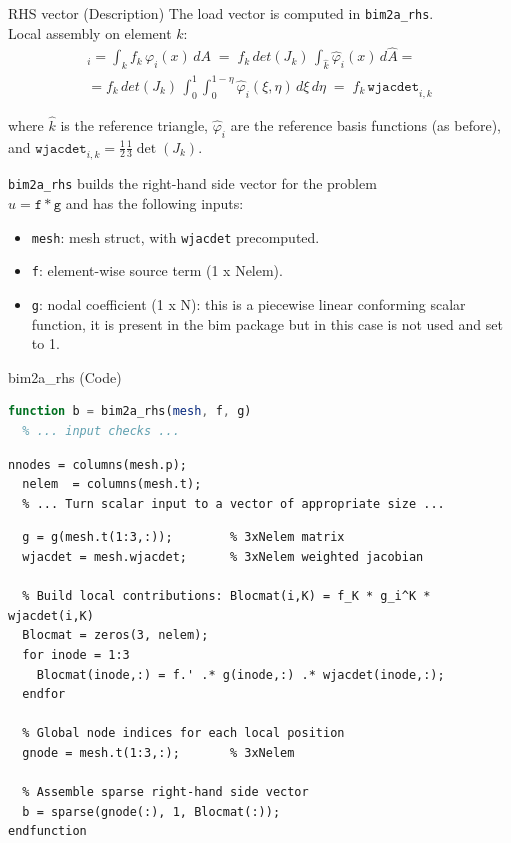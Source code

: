 \documentclass[aspectratio=54,xcolor=dvipsnames]{beamer}
\begin{document}
\begin{frame}{RHS vector (Description)}
    \small
    The load vector is computed in \texttt{bim2a\_rhs}. \\
    Local assembly on element \(k\):
    \begin{align*}
      [b^{k}]_{i}
      = \int_{k} f_{k}\,\varphi_i(x)\,dA \;=\; f_{k}\,det(J_k)\,\int_{\hat{k}} \hat{\varphi}_i(x)\,d\hat{A} = \\
      = f_{k}\,det(J_k)\,\int_{0}^{1} \int_{0}^{1-\eta} \hat{\varphi}_i(\xi,\eta) \,d\xi\,d\eta\;=\;
      f_{k}\,\texttt{wjacdet}_{i,k}
    \end{align*}
    
    where $\hat{k}$ is the reference triangle, $\hat{\varphi}_i$ are the reference basis functions (as before), and \(\texttt{wjacdet}_{i,k}=\tfrac12\tfrac13\det(J_k)\).  
    \bigskip

    \texttt{bim2a\_rhs} builds the right-hand side vector for the problem \\
    $ u = \texttt{f} * \texttt{g}$  and has the following inputs:
    \begin{itemize}
      \item \texttt{mesh}: mesh struct, with \texttt{wjacdet} precomputed.
      \item \texttt{f}: element-wise source term (1 x Nelem).
      \item \texttt{g}: nodal coefficient (1 x N): this is a piecewise linear conforming scalar function, it is present in the bim package but in this case is not used and set to 1.
    \end{itemize}
\end{frame}

\begin{frame}[fragile]{bim2a\_rhs (Code)}
\scriptsize
\begin{lstlisting}[language=Octave,firstnumber=40]
function b = bim2a_rhs(mesh, f, g)
  % ... input checks ...
\end{lstlisting}
\begin{lstlisting}[firstnumber=50]
  nnodes = columns(mesh.p);
  nelem  = columns(mesh.t);
  % ... Turn scalar input to a vector of appropriate size ...
\end{lstlisting}
\begin{lstlisting}[firstnumber=68]
  % Extract g at each element's nodes
  g = g(mesh.t(1:3,:));        % 3xNelem matrix
  wjacdet = mesh.wjacdet;      % 3xNelem weighted jacobian

  % Build local contributions: Blocmat(i,K) = f_K * g_i^K * wjacdet(i,K)
  Blocmat = zeros(3, nelem);
  for inode = 1:3
    Blocmat(inode,:) = f.' .* g(inode,:) .* wjacdet(inode,:);
  endfor

  % Global node indices for each local position
  gnode = mesh.t(1:3,:);       % 3xNelem

  % Assemble sparse right-hand side vector
  b = sparse(gnode(:), 1, Blocmat(:));
endfunction
\end{lstlisting}
\end{frame}
\end{document}
